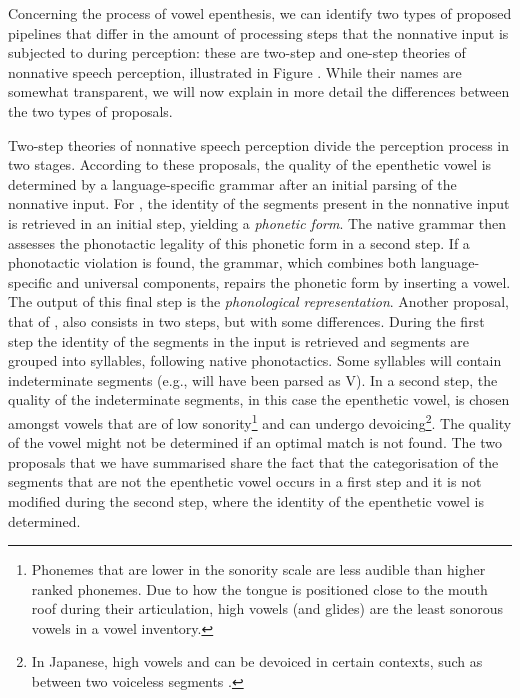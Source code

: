 Concerning the process of vowel epenthesis, we can identify two types of proposed pipelines that differ in the amount of processing steps that the nonnative input is subjected to during perception: these are two-step and one-step theories of nonnative speech perception, illustrated in Figure \label{ref:intro_12step}. While their names are somewhat transparent, we will now explain in more detail the differences between the two types of proposals.   

Two-step theories of nonnative speech perception divide the perception process in two stages. According to these proposals, the quality of the epenthetic vowel is determined by a language-specific grammar after an initial parsing of the nonnative input.
For \cite{berent2007}, the identity of the segments present in the nonnative input is retrieved in an initial step, yielding a \textit{phonetic form}. The native grammar then assesses the phonotactic legality of this phonetic form in a second step. If a phonotactic violation is found, the grammar, which combines both language-specific and universal components, repairs the phonetic form by inserting a vowel. The output of this final step is the \textit{phonological representation}.
Another proposal, that of \cite{monahan2009}, also consists in two steps, but with some differences. During the first step the identity of the segments in the input is retrieved and segments are grouped into syllables, following native phonotactics. Some syllables will contain indeterminate segments (e.g.,  will have been parsed as V). In a second step, the quality of the indeterminate segments, in this case the epenthetic vowel, is chosen amongst vowels that are of low sonority\footnote{Phonemes that are lower in the sonority scale are less audible than higher ranked phonemes. Due to how the tongue is positioned close to the mouth roof during their articulation, high vowels (and glides) are the least sonorous vowels in a vowel inventory.} and can undergo devoicing\footnote{In Japanese, high vowels  and  can be devoiced in certain contexts, such as between two voiceless segments \cite{han1962,vance1987, tsuchida2001}.}. 
The quality of the vowel might not be determined if an optimal match is not found.
The two proposals that we have summarised share the fact that the categorisation of the segments that are not the epenthetic vowel occurs in a first step and it is not modified during the second step, where the identity of the epenthetic vowel is determined.

